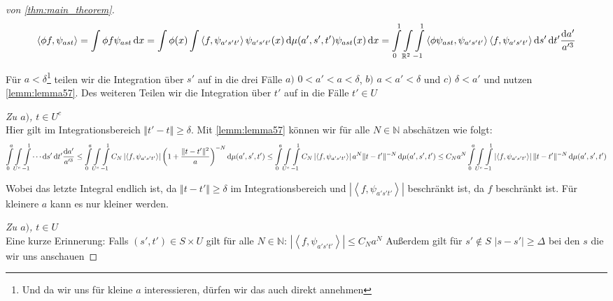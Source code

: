 \begin{proof}[von \ref{thm:main_theorem}]
\begin{dmath*}
    \left\langle \phi f, \psi_{ast} \right\rangle
    =
    \int \phi f \psi_{ast} \d x
    =
    \int \phi(x) \int \left\langle f, \psi_{a' s' t'} \right\rangle
    \psi_{a's't'} (x) \d \mu(a',s',t') \psi_{ast}(x) \d x
    =
    \int\limits_{0}^{1} \int\limits_{\mathbb{R}^2} \int\limits_{-1}^1
    \left\langle \phi \psi_{ast}, \psi_{a's't'} \right\rangle
    \left\langle f, \psi_{a's't'} \right\rangle
    \d s' \d t' \frac{\d a'}{a^{\prime 3}}
\end{dmath*}


Für $a < \delta$\footnote{Und da wir uns für kleine $a$ interessieren, dürfen wir das auch direkt annehmen} teilen wir die Integration über $s'$ auf in die drei Fälle $a)$ $0<a'<a<\delta$, $b)$ $a < a' < \delta$ und $c)$ $\delta < a'$ und nutzen \cref{lemm:lemma57}. Des weiteren Teilen wir die Integration über $t'$ auf in die Fälle $t' \in U$

\emph{Zu $a)$, $t \in U^c$}\\[.5em]
Hier gilt im Integrationsbereich $\Vert t' - t \Vert \geq \delta$. Mit \cref{lemm:lemma57} können wir für alle $N\in \mathbb{N}$ abschätzen wie folgt:
\begin{dmath*}
 \int\limits_{0}^{a} \int\limits_{U^c} \int\limits_{-1}^1
 \cdots
    \d s' \d t' \frac{\d a'}{a^{\prime 3}}
\leq
\int\limits_{0}^{a} \int\limits_{U^c} \int\limits_{-1}^1
C_N
\left| \left\langle f, \psi_{a's't'} \right\rangle \right|
\left(1+\frac{\Vert t-t' \Vert^2}{a}\right)^{-N} \d \mu(a',s',t')
\leq
\int\limits_{0}^{a} \int\limits_{U^c} \int\limits_{-1}^1
C_N
\left| \left\langle f, \psi_{a's't'} \right\rangle \right|
a^N \Vert t-t' \Vert^{-N} \d \mu(a',s',t')
\leq
C_N a^N
\int\limits_{0}^{a} \int\limits_{U^c} \int\limits_{-1}^1
\left| \left\langle f, \psi_{a's't'} \right\rangle \right|
\Vert t-t' \Vert^{-N} \d \mu(a',s',t')
\end{dmath*}

Wobei das letzte Integral endlich ist, da $\Vert t-t'\Vert \geq \delta$ im Integrationsbereich und $\left| \left\langle f, \psi_{a's't'} \right\rangle \right|$ beschränkt ist, da $f$ beschränkt ist. Für kleinere $a$ kann es nur kleiner werden.


\emph{Zu $a)$, $t \in U$}\\[.5em]
Eine kurze Erinnerung: Falls $(s',t') \in S \times U$ gilt für alle $N \in \mathbb{N}$:
$\left| \left\langle f, \psi_{a's't'} \right\rangle \right| \leq C_N a^N$
Außerdem gilt für $s' \notin S$ $|s-s'| \geq \Delta$ bei den $s$ die wir uns anschauen


\end{proof}
